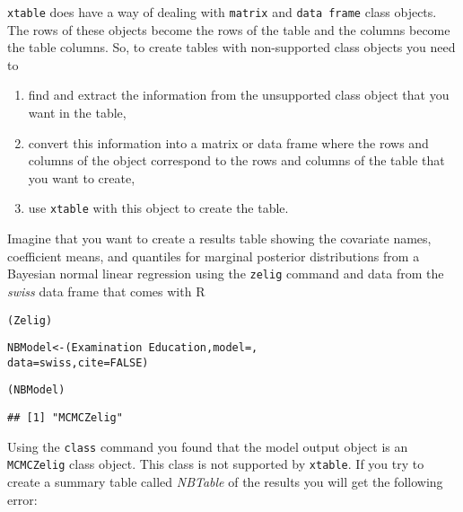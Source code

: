 {\tt{xtable}} does have a way of dealing with {\tt{matrix}} and {\tt{data frame}} class objects. The rows of these objects become the rows of the table and the columns become the table columns. So, to create tables with non-supported class objects you need to

\begin{enumerate}
    \item find and extract the information from the unsupported class object that you want in the table, 
    \item convert this information into a matrix or data frame where the rows and columns of the object correspond to the rows and columns of the table that you want to create,
    \item use {\tt{xtable}} with this object to create the table.
\end{enumerate}

Imagine that you want to create a results table showing the covariate names, coefficient means, and quantiles for marginal posterior distributions from a Bayesian normal linear regression using the {\tt{zelig}} command \cite[]{Goodrich2007,R-Zelig} and data from the {\emph{swiss}} data frame that comes with R


\begin{knitrout}
\color{fgcolor}\begin{kframe}
\begin{alltt}
(Zelig)

NBModel <- (Examination ~ Education, model = , 
                    data = swiss, cite = FALSE)

(NBModel)
\end{alltt}
\begin{verbatim}
## [1] "MCMCZelig"
\end{verbatim}
\end{kframe}
\end{knitrout}


Using the {\tt{class}} command you found that the model output object is an {\tt{MCMCZelig}} class object. This class is not supported by {\tt{xtable}}. If you try to create a summary table called {\emph{NBTable}} of the results you will get the following error:

